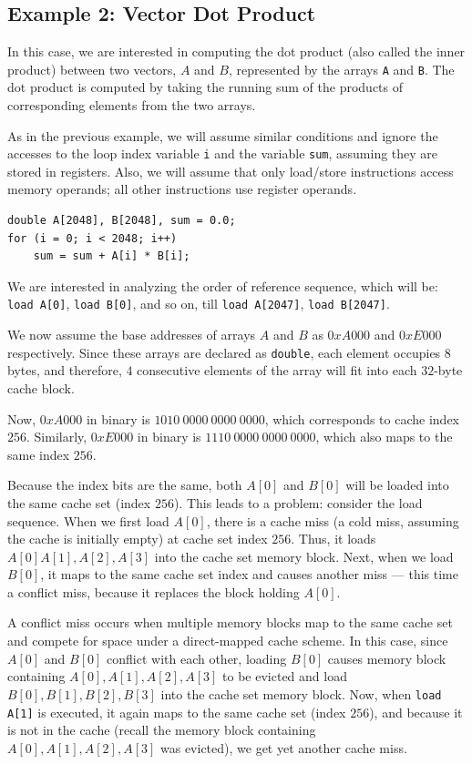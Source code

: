\documentclass[12pt]{book}
\begin{document}
\subsection{Example 2: Vector Dot Product}
In this case, we are interested in computing the dot product (also called the inner product) between two vectors, $A$ and $B$, represented by the arrays \texttt{A} and \texttt{B}. The dot product is computed by taking the running sum of the products of corresponding elements from the two arrays. 

As in the previous example, we will assume similar conditions and ignore the accesses to the loop index variable \texttt{i} and the variable \texttt{sum}, assuming they are stored in registers. Also, we will assume that only load/store instructions access memory operands; all other instructions use register operands.

\begin{lstlisting}[style=cppstyle, caption={Vector Dot Product}]
double A[2048], B[2048], sum = 0.0;
for (i = 0; i < 2048; i++) 
    sum = sum + A[i] * B[i];
\end{lstlisting}

We are interested in analyzing the order of reference sequence, which will be: \texttt{load A[0]}, \texttt{load B[0]}, and so on, till \texttt{load A[2047]}, \texttt{load B[2047]}.

We now assume the base addresses of arrays $A$ and $B$ as $0xA000$ and $0xE000$ respectively. Since these arrays are declared as \texttt{double}, each element occupies $8$ bytes, and therefore, $4$ consecutive elements of the array will fit into each $32$-byte cache block.

Now, $0xA000$ in binary is $1010\ 0000\ 0000\ 0000$, which corresponds to cache index $256$. Similarly, $0xE000$ in binary is $1110\ 0000\ 0000\ 0000$, which also maps to the same index $256$.

Because the index bits are the same, both $A[0]$ and $B[0]$ will be loaded into the same cache set (index $256$). This leads to a problem: consider the load sequence. When we first load $A[0]$, there is a cache miss (a cold miss, assuming the cache is initially empty) at cache set index $256$. Thus, it loads $A[0] A[1], A[2], A[3]$ into the cache set memory block. Next, when we load $B[0]$, it maps to the same cache set index and causes another miss — this time a conflict miss, because it replaces the block holding $A[0]$.

A conflict miss occurs when multiple memory blocks map to the same cache set and compete for space under a direct-mapped cache scheme. In this case, since $A[0]$ and $B[0]$ conflict with each other, loading $B[0]$ causes memory block containing $A[0], A[1], A[2], A[3]$ to be evicted and load $B[0], B[1], B[2], B[3]$ into the cache set memory block. Now, when \texttt{load A[1]} is executed, it again maps to the same cache set (index $256$), and because it is not in the cache (recall the memory block containing $A[0], A[1], A[2], A[3]$ was evicted), we get yet another cache miss.
\end{document}
